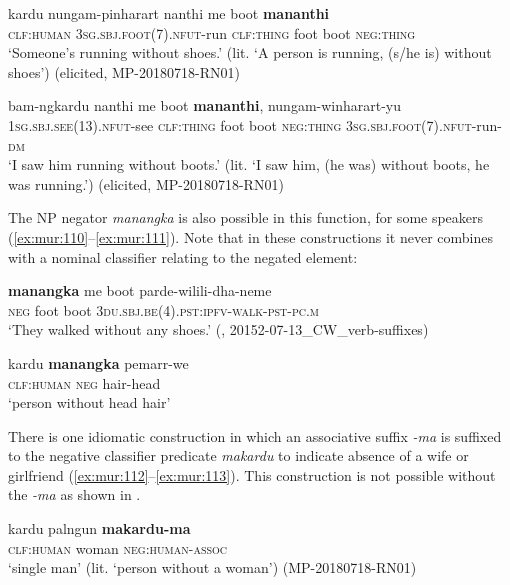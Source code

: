\documentclass[output=paper,colorlinks,citecolor=brown]{langscibook}
\begin{document}
\ea\label{ex:mur:108}
    \gll kardu nungam-pinharart nanthi me boot \textbf{mananthi}\\
         \textsc{clf:human} \textsc{3sg.sbj.foot(7).nfut}{}-run \textsc{clf:thing} foot boot \textsc{neg:thing}\\
    \glt ‘Someone’s running without shoes.’ (lit. ‘A person is running, (s/he is) without shoes’) (elicited, MP-20180718-RN01)
\z 

\ea\label{ex:mur:109} 
    \gll bam-ngkardu nanthi me boot \textbf{mananthi}, nungam-winharart-yu\\
         \textsc{1sg.sbj.see(13).nfut}{}-see \textsc{clf:thing} foot boot \textsc{neg:thing} \textsc{3sg.sbj.foot(7).nfut}{}-run-\textsc{dm}\\
    \glt ‘I saw him running without boots.’ (lit. ‘I saw him, (he was) without boots, he was running.’) (elicited, MP-20180718-RN01)
\z 

The NP negator \textit{manangka} is also possible in this function, for some speakers (\ref{ex:mur:110}--\ref{ex:mur:111}). Note that in these constructions it never combines with a nominal classifier relating to the negated element: 

\ea\label{ex:mur:110}
    \gll \textbf{manangka} me boot parde-wilili-dha-neme\\
         \textsc{neg} foot boot \textsc{3du.sbj.be(4).pst:ipfv-walk-pst-pc.m}\\
    \glt  ‘They walked without any shoes.’ (\citealt{MansfieldEtAl2019}, 20152-07-13\_CW\_verb-suffixes)
\z 

\ea\label{ex:mur:111} 
    \gll kardu \textbf{manangka} pemarr-we\\
         \textsc{clf:human} \textsc{neg} hair-head\\
    \glt ‘person without head hair’ \citep[182]{Walsh1976}
\z 

There is one idiomatic construction in which an associative suffix \textit{{}-ma} is suffixed to the negative classifier predicate \textit{makardu} to indicate absence of a wife or girlfriend (\ref{ex:mur:112}--\ref{ex:mur:113}). This construction is not possible without the \textit{{}-ma} as shown in .

\ea\label{ex:mur:112}
    \gll kardu palngun \textbf{makardu-ma}\\
         \textsc{clf:human} woman \textsc{neg:human-assoc}\\
    \glt ‘single man’ (lit. ‘person without a woman’) (MP-20180718-RN01)
\z 
\end{document}

